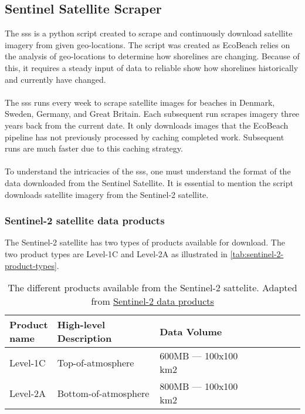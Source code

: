 \subsection{Sentinel Satellite Scraper}\label{subsec:sentinel-satellite-scraper}
The \acrfull{sss} is a python script created to scrape and continuously download satellite imagery from given geo-locations. The script was created as EcoBeach relies on the analysis of geo-locations to determine how shorelines are changing. Because of this, it requires a steady input of data to reliable show how shorelines historically and currently have changed.\\\\
\noindent
The \acrshort{sss} runs every week to scrape satellite images for beaches in Denmark, Sweden, Germany, and Great Britain. Each subsequent run scrapes imagery three years back from the current date. It only downloads images that the EcoBeach pipeline has not previously processed by caching completed work. Subsequent runs are much faster due to this caching strategy. \\\\
\noindent
To understand the intricacies of the \acrshort{sss}, one must understand the format of the data downloaded from the Sentinel Satellite. It is essential to mention the script downloads satellite imagery from the Sentinel-2 satellite.

\subsubsection{Sentinel-2 satellite data products}

The Sentinel-2 satellite has two types of products available for download. The two product types are Level-1C and Level-2A as illustrated in \autoref{tab:sentinel-2-product-types}.

\begin{table}[h!]
    \centering
    \begin{tabular}{| p{0.15\linewidth} | p{0.35\linewidth} | p{0.35\linewidth} |p{0.15\linewidth} |}
        \hline
        \textbf{Product name} & \textbf{High-level Description} & \textbf{Data Volume} \\ \hline
        Level-1C              & Top-of-atmosphere               & 600MB — 100x100 km2  \\\hline
        Level-2A              & Bottom-of-atmosphere            & 800MB — 100x100 km2  \\\hline
    \end{tabular}
    \caption{The different products available from the Sentinel-2 sattelite. Adapted from \href{https://sentinels.copernicus.eu/web/sentinel/missions/sentinel-2/data-products}{Sentinel-2 data products}}
    \label{tab:sentinel-2-product-types}
\end{table}

